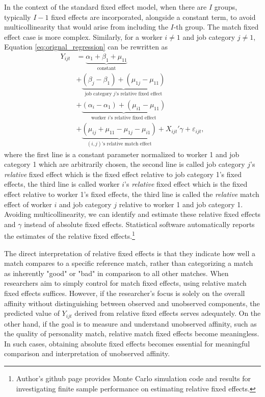 \documentclass[12pt]{article}
\begin{document}
In the context of the standard fixed effect model, when there are \( I \) groups, typically \( I - 1 \) fixed effects are incorporated, alongside a constant term, to avoid multicollinearity that would arise from including the \( I \)-th group. The match fixed effect case is more complex. Similarly, for a worker \( i \neq 1 \) and job category \( j \neq 1 \), Equation \eqref{eq:orignal_regression} can be rewritten as
\begin{align}
    Y_{ijt}&=\underbrace{\alpha_{1}+\beta_{1}+\mu_{11}}_{\text{constant}}\nonumber\\
    &+\underbrace{(\beta_{j}-\beta_{1})+(\mu_{1j}-\mu_{11})}_{\text{job category }j\text{'s relative fixed effect}}\nonumber\\
    &+\underbrace{(\alpha_{i}-\alpha_{1})+(\mu_{i1}-\mu_{11})}_{\text{worker }i\text{'s relative fixed effect}}\nonumber\\
    &+\underbrace{(\mu_{ij}+\mu_{11}-\mu_{1j}-\mu_{i1})}_{(i,j)\text{'s relative match effect}}+ X_{ijt}'\gamma+\varepsilon_{ijt},
\end{align}
where the first line is a constant parameter normalized to worker 1 and job category 1 which are arbitrarily chosen, the second line is called job category $j$'s \textit{relative} fixed effect which is the fixed effect relative to job category 1's fixed effects, the third line is called worker $i$'s \textit{relative} fixed effect which is the fixed effect relative to worker 1's fixed effects, the third line is called the \textit{relative} match effect of worker $i$ and job category $j$ relative to worker 1 and job category 1.
Avoiding multicollinearity, we can identify and estimate these relative fixed effects and $\gamma$ instead of absolute fixed effects. 
Statistical software automatically reports the estimates of the relative fixed effects.\footnote{Author's github page provides Monte Carlo simulation code and results for investigating finite sample performance on estimating relative fixed effects.}

The direct interpretation of relative fixed effects is that they indicate how well a match compares to a specific reference match, rather than categorizing a match as inherently "good" or "bad" in comparison to all other matches. When researchers aim to simply control for match fixed effects, using relative match fixed effects suffices. However, if the researcher's focus is solely on the overall affinity without distinguishing between observed and unobserved components, the predicted value of \( Y_{ijt} \) derived from relative fixed effects serves adequately.
On the other hand, if the goal is to measure and understand unobserved affinity, such as the quality of personality match, relative match fixed effects become meaningless. In such cases, obtaining absolute fixed effects becomes essential for meaningful comparison and interpretation of unobserved affinity.
\end{document}
